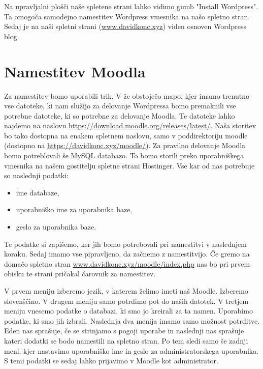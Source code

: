 \documentclass[a4paper,12pt,openright]{book}
\begin{document}
Na upravljalni plošči naše spletene strani lahko vidimo gumb "Install Wordpress". Ta omogoča samodejno namestitev Wordpress vmesnika na našo spletno stran. Sedaj je na naši spletni strani (\href{www.davidkonc.xyz}{www.davidkonc.xyz}) viden osnoven Wordpress blog.

\section{Namestitev Moodla}
Za namestitev bomo uporabili trik. V že obstoječo mapo, kjer imamo trenutno vse datoteke, ki nam služijo za delovanje Wordpressa bomo premaknili vse potrebne datoteke, ki so potrebne za delovanje Moodla. Te datoteke lahko najdemo na naslovu \href{https://download.moodle.org/releases/latest/}{https://download.moodle.org/releases/latest/}. Naša storitev bo tako dostopna na enakem spletnem naslovu, samo v poddirektoriju moodle (dostopno na \href{https://davidkonc.xyz/moodle/}{https://davidkonc.xyz/moodle/}).
\newline
Za pravilno delovanje Moodla bomo potreblovali še MySQL databazo. To bomo storili preko uporabniškega vmesnika na našem gostitelju spletne strani Hostinger. Vse kar od nas potrebuje so naslednji podatki:
\begin{itemize}
    \item ime databaze,
    \item uporabniško ime za uporabnika baze,
    \item geslo za uporabnika baze.
\end{itemize}
Te podatke si zapišemo, ker jih bomo potrebovali pri namestitvi v naslednjem koraku. 
\newline
Sedaj imamo vse pipravljeno, da začnemo z namestitvijo. Če gremo na domačo spletno stran \href{www.davidkonc.xyz/moodle/index.php}{www.davidkonc.xyz/moodle/index.php} nas bo pri prvem obisku te strani pričakal čarovnik za namestitev. 

V prvem meniju izberemo jezik, v katerem želimo imeti naš Moodle. Izberemo slovenščino. V drugem meniju samo potrdimo pot do naših datotek. V tretjem meniju vnesemo podatke o databazi, ki smo jo kreirali za ta namen. Uporabimo podatke, ki smo jih izbrali. Naslednja dva menija imamo samo možnost potrditve. Eden nas sprašuje, če se strinjamo s pogoji uporabe in naslednji nas sprašuje kateri dodatki se bodo namestili na spletno stran. Po tem sledi samo še zadnji meni, kjer nastavimo uporabniško ime in geslo za administratorskega uporabnika. S temi podatki se sedaj lahko prijavimo v Moodle kot administrator. 
\end{document}
